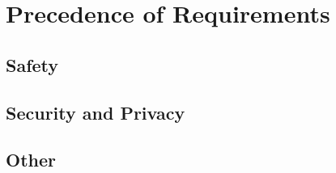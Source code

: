 \KNEADSECTIONNEWPAGE
\section{Precedence of Requirements}
\label{lab:sec_Precedence}


\KNEADSUBSECTIONNEWPAGE
\subsection{Safety}
\label{lab:ssec_Precedence_Safety}




\KNEADSUBSECTIONNEWPAGE
\subsection{Security and Privacy}
\label{lab:ssec_Precedence_SecurityAndPrivacy}



\KNEADSUBSECTIONNEWPAGE
\subsection{Other}
\label{lab:ssec_Precedence_Other}



